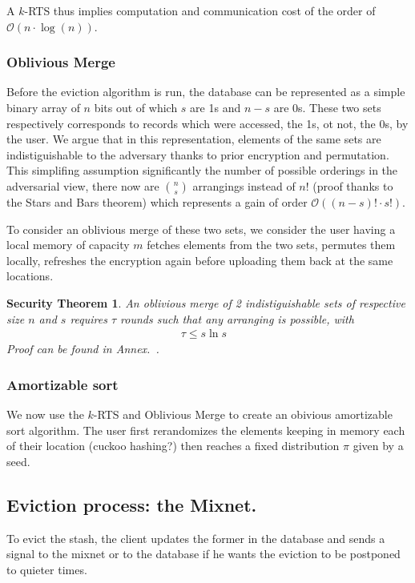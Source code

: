 \documentclass[a4paper]{article}
\newtheorem{secthm}{Security Theorem}
\begin{document}
A $k$-RTS thus implies computation and communication cost of the order of $\mathcal{O} \left(n\cdot \log(n)\right)$.

\subsubsection{Oblivious Merge}
Before the eviction algorithm is run, the database can be represented as a simple binary array of $n$ bits out of which $s$ are 1s and $n-s$ are 0s. These two sets respectively corresponds to records which were accessed, the 1s, ot not, the 0s, by the user.
We argue that in this representation, elements of the same sets are indistiguishable to the adversary thanks to prior encryption and permutation. This simplifing assumption significantly the number of possible orderings in the adversarial view, there now are ${n \choose s}$ arrangings instead of $n!$ (proof thanks to the Stars and Bars theorem) which represents a gain of order $\mathcal{O}\left ( (n-s)!\cdot s!\right )$.

To consider an oblivious merge of these two sets, we consider the user having a local memory of capacity $m$ fetches elements from the two sets, permutes them locally, refreshes the encryption again before uploading them back at the same locations.

\begin{secthm}
An oblivious merge of 2 indistiguishable sets of respective size $n$ and $s$ requires $\tau$ rounds such that any arranging is possible, with
\begin{align*}
\tau \leq s \ln{s}&
\end{align*}
Proof can be found in Annex.~\cite{}.
\end{secthm}

\subsubsection{Amortizable sort}

We now use the $k$-RTS and Oblivious Merge to create an obivious amortizable sort algorithm.
The user first rerandomizes the elements keeping in memory each of their location (cuckoo hashing?) then reaches a fixed distribution $\pi$ given by a seed.

\subsection{Eviction process: the Mixnet.}
To evict the stash, the client updates the former in the database and sends a signal to the mixnet or to the database if he wants the eviction to be postponed to quieter times.
\end{document}
